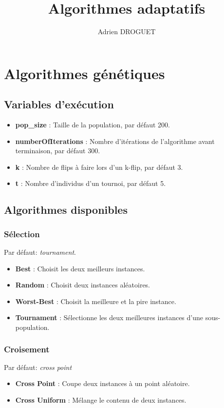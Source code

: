 \documentclass[a4paper,10pt]{report}
\title{Algorithmes adaptatifs}
\author{Adrien DROGUET}
\begin{document}
\maketitle


\chapter{Algorithmes génétiques}
\section{Variables d'exécution}
\begin{itemize}
  \item \textbf{pop\_size} : Taille de la population, par défaut 200.
  \item \textbf{numberOfIterations} : Nombre d'itérations de l'algorithme avant terminaison, par défaut 300.
  \item \textbf{k} : Nombre de flips à faire lors d'un k-flip, par défaut 3.
  \item \textbf{t} : Nombre d'individus d'un tournoi, par défaut 5.
\end{itemize}



\section{Algorithmes disponibles}
\subsection{Sélection}
Par défaut: \textit{tournament}.
\begin{itemize}
  \item \textbf{Best} : Choisit les deux meilleurs instances.
  \item \textbf{Random} : Choisit deux instances aléatoires.
  \item \textbf{Worst-Best} : Choisit la meilleure et la pire instance.
  \item \textbf{Tournament} : Sélectionne les deux meilleures instances d'une sous-population.
\end{itemize}


\subsection{Croisement}
Par défaut: \textit{cross point}
\begin{itemize}
  \item \textbf{Cross Point} : Coupe deux instances à un point aléatoire.
  \item \textbf{Cross Uniform} : Mélange le contenu de deux instances.
\end{itemize}
\end{document}
